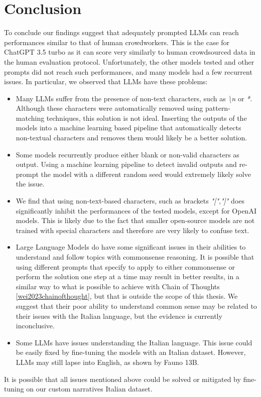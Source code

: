 \chapter{Conclusion}
\label{cha:conclusion}
To conclude our findings suggest that adequately prompted LLMs can reach performances similar to that of human crowdworkers. This is the case for ChatGPT 3.5 turbo as it can score very similarly to human crowdsourced data in the human evaluation protocol.
Unfortunately, the other models tested and other prompts did not reach such performances, and many models had a few recurrent issues. In particular, we observed that LLMs have these problems:
\begin{itemize}
    \item Many LLMs suffer from the presence of non-text characters, such as \emph{\textbackslash n} or \emph{*}. Although these characters were automatically removed using pattern-matching techniques, this solution is not ideal. Inserting the outputs of the models into a machine learning based pipeline that automatically detects non-textual characters and removes them would likely be a better solution.
    \item Some models recurrently produce either blank or non-valid characters as output. Using a machine learning pipeline to detect invalid outputs and re-prompt the model with a different random seed would extremely likely solve the issue.
    \item We find that using non-text-based characters, such as brackets \emph{"["},\emph{"]"} does significantly inhibit the performances of the tested models, except for OpenAI models. This is likely due to the fact that smaller open-source models are not trained with special characters and therefore are very likely to confuse text.
    \item Large Language Models do have some significant issues in their abilities to understand and follow topics with commonsense reasoning. It is possible that using different prompts that specify to apply to either commonsense or perform the solution one step at a time may result in better results, in a similar way to what is possible to achieve with Chain of Thoughts \ref{wei2023chainofthought}, but that is outside the scope of this thesis. We suggest that their poor ability to understand common sense may be related to their issues with the Italian language, but the evidence is currently inconclusive.
    \item Some LLMs have issues understanding the Italian language. This issue could be easily fixed by fine-tuning the models with an Italian dataset. However, LLMs may still lapse into English, as shown by Fauno 13B.
\end{itemize}
It is possible that all issues mentioned above could be solved or mitigated by fine-tuning on our custom narratives Italian dataset.

